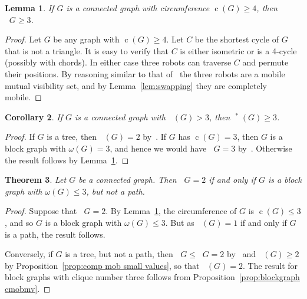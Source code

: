 \documentclass[a4paper,12pt]{article}
\DeclareMathOperator{\mobmv}{Mob_{\mu}}
\DeclareMathOperator{\cmobmv}{Mob^*_{\mu}}
\DeclareMathOperator{\cir}{c}
\newtheorem{theorem}{Theorem}[section]
\newtheorem{lemma}[theorem]{Lemma}
\newtheorem{corollary}[theorem]{Corollary}
\theoremstyle{definition}
\begin{document}
	\begin{lemma}\label{mobmv>3}
		If $G$ is a connected graph with circumference $\cir (G) \geq 4$, then $\cmobmv{G} \geq 3$.
	\end{lemma}
	\begin{proof}
		Let $G$ be any graph with $\cir (G) \geq 4$. Let $C$ be the shortest cycle of $G$ that is not a triangle. It is easy to verify that $C$ is either isometric or is a 4-cycle (possibly with chords). In either case three robots can traverse $C$ and permute their positions. By reasoning similar to that of~\cite[Theorem 3.4]{dettlaff2024} the three robots are a mobile mutual visibility set, and by Lemma~\ref{lem:swapping} they are completely mobile.  
	\end{proof}
	
	\begin{corollary}
		If $G$ is a connected graph with $\mobmv (G) > 3$, then $\mobmv ^*(G) \geq 3$.    
	\end{corollary}
	\begin{proof}
		If $G$ is a tree, then $\mobmv (G) = 2$ by~\cite[Theorem 3.4]{dettlaff2024}. If $G$ has $\cir (G) = 3$, then $G$ is a block graph with $\omega (G) = 3$, and hence we would have $\mobmv{G} = 3$ by~\cite[Corollary 3.3]{dettlaff2024}. Otherwise the result follows by Lemma~\ref{mobmv>3}.
	\end{proof}
	
	
	
	\begin{theorem}\label{thm:cmobmv = 2}
		Let $G$ be a connected graph. Then $\cmobmv{G} = 2$ if and only if $G$ is a block graph with $\omega(G) \leq 3$, but not a path.
	\end{theorem}
	\begin{proof}
		Suppose that $\cmobmv{G} = 2$. By Lemma~\ref{mobmv>3}, the circumference of $G$ is $\cir (G) \leq 3$, and so $G$ is a block graph with $\omega (G) \leq 3$. But as $\cmobmv(G) = 1$ if and only if $G$ is a path, the result follows.
		
		Conversely, if $G$ is a tree, but not a path, then $\cmobmv{G} \leq \mobmv{G} = 2$ by~\cite[Theorem 3.4]{dettlaff2024} and $\cmobmv (G) \geq 2$ by Proposition~\ref{prop:comp mob small values}, so that $\cmobmv (G) = 2$. The result for block graphs with clique number three follows from Proposition~\ref{prop:blockgraph cmobmv}.
	\end{proof}
	
\end{document}
